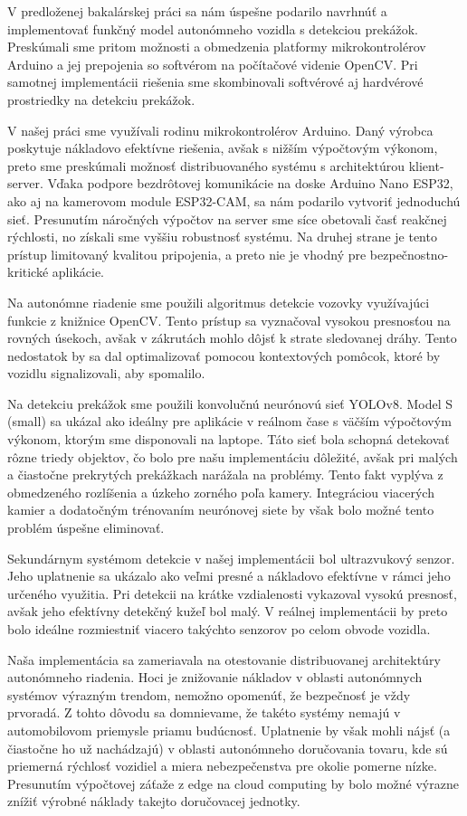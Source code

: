 V predloženej bakalárskej práci sa nám úspešne podarilo navrhnúť a implementovať funkčný model autonómneho vozidla s detekciou prekážok. Preskúmali sme pritom možnosti a obmedzenia platformy mikrokontrolérov Arduino a jej prepojenia so softvérom na počítačové videnie OpenCV. Pri samotnej implementácii riešenia sme skombinovali softvérové aj hardvérové prostriedky na detekciu prekážok.\par
V našej práci sme využívali rodinu mikrokontrolérov Arduino. Daný výrobca poskytuje nákladovo efektívne riešenia, avšak s nižším výpočtovým výkonom, preto sme preskúmali možnosť distribuovaného systému s architektúrou klient-server. Vďaka podpore bezdrôtovej komunikácie na doske Arduino Nano ESP32, ako aj na kamerovom module ESP32-CAM, sa nám podarilo vytvoriť jednoduchú sieť. Presunutím náročných výpočtov na server sme síce obetovali časť reakčnej rýchlosti, no získali sme vyššiu robustnosť systému. Na druhej strane je tento prístup limitovaný kvalitou pripojenia, a preto nie je vhodný pre bezpečnostno-kritické aplikácie.\par
Na autonómne riadenie sme použili algoritmus detekcie vozovky využívajúci funkcie z knižnice OpenCV. Tento prístup sa vyznačoval vysokou presnosťou na rovných úsekoch, avšak v zákrutách mohlo dôjsť k strate sledovanej dráhy. Tento nedostatok by sa dal optimalizovať pomocou kontextových pomôcok, ktoré by vozidlu signalizovali, aby spomalilo.\par
Na detekciu prekážok sme použili konvolučnú neurónovú sieť YOLOv8. Model S (small) sa ukázal ako ideálny pre aplikácie v reálnom čase s väčším výpočtovým výkonom, ktorým sme disponovali na laptope. Táto sieť bola schopná detekovať rôzne triedy objektov, čo bolo pre našu implementáciu dôležité, avšak pri malých a čiastočne prekrytých prekážkach narážala na problémy. Tento fakt vyplýva z obmedzeného rozlíšenia a úzkeho zorného poľa kamery. Integráciou viacerých kamier a dodatočným trénovaním neurónovej siete by však bolo možné tento problém úspešne eliminovať.\par
Sekundárnym systémom detekcie v našej implementácii bol ultrazvukový senzor. Jeho uplatnenie sa ukázalo ako veľmi presné a nákladovo efektívne v rámci jeho určeného využitia. Pri detekcii na krátke vzdialenosti vykazoval vysokú presnosť, avšak jeho efektívny detekčný kužeľ bol malý. V reálnej implementácii by preto bolo ideálne rozmiestniť viacero takýchto senzorov po celom obvode vozidla.\par
Naša implementácia sa zameriavala na otestovanie distribuovanej architektúry autonómneho riadenia. Hoci je znižovanie nákladov v oblasti autonómnych systémov výrazným trendom, nemožno opomenúť, že bezpečnosť je vždy prvoradá. Z tohto dôvodu sa domnievame, že takéto systémy nemajú v automobilovom priemysle priamu budúcnosť. Uplatnenie by však mohli nájsť (a čiastočne ho už nachádzajú) v oblasti autonómneho doručovania tovaru, kde sú priemerná rýchlosť vozidiel a miera nebezpečenstva pre okolie pomerne nízke. Presunutím výpočtovej záťaže z edge na cloud computing by bolo možné výrazne znížiť výrobné náklady takejto doručovacej jednotky.\par
